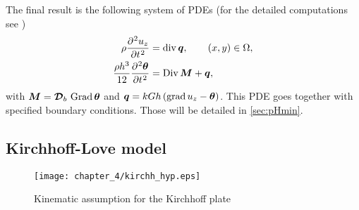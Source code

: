 The final result is the following system of PDEs (for the detailed computations see \cite[Chapter 10]{reddy2006theory})
\begin{equation}\label{eq:classMin}
\begin{aligned}
\rho \diffp[2]{u_z}{t} &= \div \bm{q}, \qquad (x,y) \in \Omega, \\
\frac{\rho h^3}{12} \diffp[2]{\bm{\theta}}{t} &=\Div \bm{M} + \bm{q},
\end{aligned}
\end{equation}
with $\bm{M}= \bm{\mathcal{D}}_b\,\operatorname*{Grad}{\bm{\theta}}$ and $\bm{q}= kGh\,(\operatorname*{grad} u_z - \bm{\theta})$. This PDE goes together with specified boundary conditions. Those will be detailed in \ref{sec:pHmin}.


\subsection{Kirchhoff-Love model}
\begin{figure}[tb]
	\centering
	\texttt{[image: chapter\_4/kirchh\_hyp.eps]}
	\caption{Kinematic assumption for the Kirchhoff plate}
	\label{fig:kirchh_hyp}
\end{figure}

